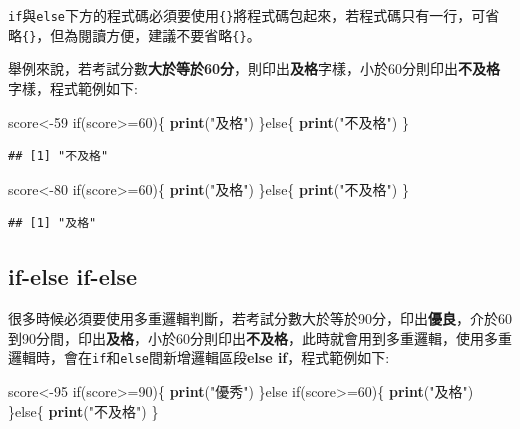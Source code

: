 \documentclass[]{book}
\newenvironment{Shaded}{\begin{snugshade}}{\end{snugshade}}
\newcommand{\KeywordTok}[1]{\textcolor[rgb]{0.13,0.29,0.53}{\textbf{{#1}}}}
\newcommand{\DecValTok}[1]{\textcolor[rgb]{0.00,0.00,0.81}{{#1}}}
\newcommand{\StringTok}[1]{\textcolor[rgb]{0.31,0.60,0.02}{{#1}}}
\newcommand{\NormalTok}[1]{{#1}}
\theoremstyle{definition}
\theoremstyle{definition}
\theoremstyle{remark}
\begin{document}
\texttt{if}與\texttt{else}下方的程式碼必須要使用\texttt{\{\}}將程式碼包起來，若程式碼只有一行，可省略\texttt{\{\}}，但為閱讀方便，建議不要省略\texttt{\{\}}。

舉例來說，若考試分數\textbf{大於等於60分}，則印出\textbf{及格}字樣，小於60分則印出\textbf{不及格}字樣，程式範例如下:

\begin{Shaded}
\begin{Highlighting}[]
\NormalTok{score<-}\DecValTok{59}
\NormalTok{if(score>=}\DecValTok{60}\NormalTok{)\{}
  \KeywordTok{print}\NormalTok{(}\StringTok{"及格"}\NormalTok{)}
\NormalTok{\}else\{}
  \KeywordTok{print}\NormalTok{(}\StringTok{"不及格"}\NormalTok{)}
\NormalTok{\}}
\end{Highlighting}
\end{Shaded}

\begin{verbatim}
## [1] "不及格"
\end{verbatim}

\begin{Shaded}
\begin{Highlighting}[]
\NormalTok{score<-}\DecValTok{80}
\NormalTok{if(score>=}\DecValTok{60}\NormalTok{)\{}
  \KeywordTok{print}\NormalTok{(}\StringTok{"及格"}\NormalTok{)}
\NormalTok{\}else\{}
  \KeywordTok{print}\NormalTok{(}\StringTok{"不及格"}\NormalTok{)}
\NormalTok{\}}
\end{Highlighting}
\end{Shaded}

\begin{verbatim}
## [1] "及格"
\end{verbatim}

\subsection{if-else if-else}\label{if-else-if-else}

很多時候必須要使用多重邏輯判斷，若考試分數大於等於90分，印出\textbf{優良}，介於60到90分間，印出\textbf{及格}，小於60分則印出\textbf{不及格}，此時就會用到多重邏輯，使用多重邏輯時，會在\texttt{if}和\texttt{else}間新增邏輯區段\textbf{else
if}，程式範例如下:

\begin{Shaded}
\begin{Highlighting}[]
\NormalTok{score<-}\DecValTok{95}
\NormalTok{if(score>=}\DecValTok{90}\NormalTok{)\{}
  \KeywordTok{print}\NormalTok{(}\StringTok{"優秀"}\NormalTok{)}
\NormalTok{\}else if(score>=}\DecValTok{60}\NormalTok{)\{}
  \KeywordTok{print}\NormalTok{(}\StringTok{"及格"}\NormalTok{)}
\NormalTok{\}else\{}
  \KeywordTok{print}\NormalTok{(}\StringTok{"不及格"}\NormalTok{)}
\NormalTok{\}}
\end{Highlighting}
\end{Shaded}
\end{document}
